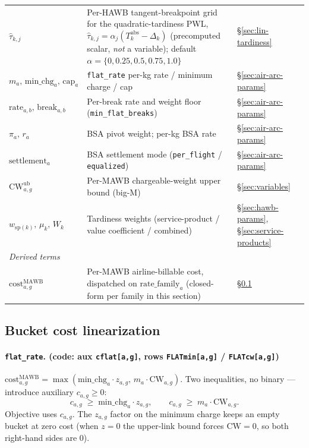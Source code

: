\documentclass[11pt,a4paper]{article}
\theoremstyle{definition}
\begin{document}
\begin{table}[H]
\begin{tabular}{lp{9cm}p{3.5cm}}
$\hat\tau_{k,j}$ & Per-HAWB tangent-breakpoint grid for the quadratic-tardiness PWL, $\hat\tau_{k,j} = \alpha_j (T_k^{\text{abs}} - \Delta_k)$ (precomputed scalar, \emph{not} a variable); default $\alpha = \{0, 0.25, 0.5, 0.75, 1.0\}$ & \S\ref{sec:lin-tardiness} \\
$m_a,\, \text{min\_chg}_a,\, \text{cap}_a$ & \texttt{flat\_rate} per-kg rate / minimum charge / cap & \S\ref{sec:air-arc-params} \\
$\text{rate}_{a,b},\, \text{break}_{a,b}$ & Per-break rate and weight floor (\texttt{min\_flat\_breaks}) & \S\ref{sec:air-arc-params} \\
$\pi_a,\, r_a$ & BSA pivot weight; per-kg BSA rate & \S\ref{sec:air-arc-params} \\
$\text{settlement}_a$ & BSA settlement mode (\texttt{per\_flight} / \texttt{equalized}) & \S\ref{sec:air-arc-params} \\
$\text{CW}^{\text{ub}}_{a,g}$ & Per-MAWB chargeable-weight upper bound (big-M) & \S\ref{sec:variables} \\
$w_{\text{sp}(k)},\, \mu_k,\, W_k$ & Tardiness weights (service-product / value coefficient / combined) & \S\ref{sec:hawb-params}, \S\ref{sec:service-products} \\
\midrule
\multicolumn{3}{l}{\textit{Derived terms}} \\
$\text{cost}^{\text{MAWB}}_{a,g}$ & Per-MAWB airline-billable cost, dispatched on $\text{rate\_family}_a$ (closed-form per family in this section) & \S\ref{sec:lin-bucket} \\
\bottomrule
\end{tabular}
\end{table}

\subsection{Bucket cost linearization }
\label{sec:lin-bucket}

\paragraph{\texttt{flat\_rate}. {\normalfont(code: aux \texttt{cflat[a,g]}, rows \texttt{FLATmin[a,g]} / \texttt{FLATcw[a,g]})}}
$\text{cost}^{\text{MAWB}}_{a,g} = \max(\text{min\_chg}_a \cdot z_{a,g},\,
m_a \cdot \text{CW}_{a,g})$. Two inequalities, no binary --- introduce
auxiliary $c_{a,g} \geq 0$:
\[
  c_{a,g} \;\geq\; \text{min\_chg}_a \cdot z_{a,g}, \qquad
  c_{a,g} \;\geq\; m_a \cdot \text{CW}_{a,g}.
\]
Objective uses $c_{a,g}$. The $z_{a,g}$ factor on the minimum charge keeps an
empty bucket at zero cost (when $z = 0$ the upper-link bound forces
$\text{CW} = 0$, so both right-hand sides are $0$).
\end{document}
